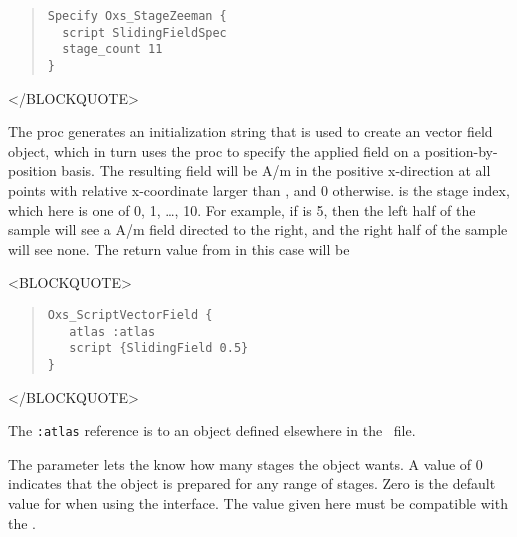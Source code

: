 \begin{description}
\begin{quote}
\begin{verbatim}
Specify Oxs_StageZeeman {
  script SlidingFieldSpec
  stage_count 11
}
\end{verbatim}
\end{quote}
\begin{rawhtml}
</BLOCKQUOTE>
\end{rawhtml}

   The  proc generates an initialization string
   that is used to create an  vector field
   object, which in turn uses the  proc to specify the
   applied field on a position-by-position basis.  The resulting field
   will be  A/m in the positive
   x-direction at all points with relative x-coordinate larger
   than , and 0 otherwise.   is the stage
   index, which here is one of 0, 1, \ldots, 10.  For example,
   if  is 5, then the left half of the sample will see
   a  A/m field directed to the right,
   and the right half of the sample will see none.  The return value
   from  in this case will be
\begin{rawhtml}
<BLOCKQUOTE>
\end{rawhtml}
\begin{quote}
\begin{verbatim}
Oxs_ScriptVectorField {
   atlas :atlas
   script {SlidingField 0.5}
}
\end{verbatim}
\end{quote}
\begin{rawhtml}
</BLOCKQUOTE>
\end{rawhtml}
   The \verb+:atlas+ reference is to an  object defined
   elsewhere in the \MIF\ file.

   The  parameter lets the
    know how many stages the
    object wants.  A value of 0 indicates that the
   object is prepared for any range of stages.  Zero is the default
   value for  when using the 
   interface.  The  value given here must be compatible
   with the .



\end{description}
